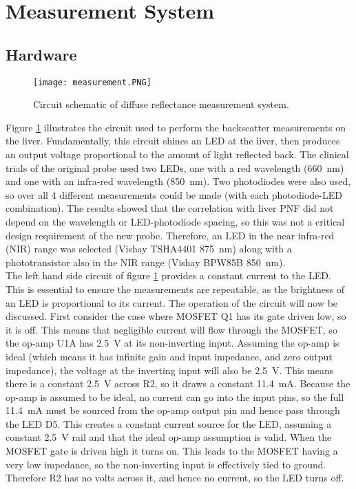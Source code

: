 \section{Measurement System}
\subsection{Hardware}

\begin{figure}[htbp]
	\centering
	\texttt{[image: measurement.PNG]}
	\caption{Circuit schematic of diffuse reflectance measurement system.}
	\label{fig: measurement schematic}
\end{figure}

Figure \ref{fig: measurement schematic} illustrates the circuit used to perform the backscatter measurements on the liver. Fundamentally, this circuit shines an LED at the liver, then produces an output voltage proportional to the amount of light reflected back. The clinical trials of the original probe \cite{Robertson} used two LEDs, one with a red wavelength (\SI{660}{\nano\metre}) and one with an infra-red wavelength (\SI{850}{\nano\metre}). Two photodiodes were also used, so over all 4 different measurements could be made (with each photodiode-LED combination). The results showed that the correlation with liver PNF did not depend on the wavelength or LED-photodiode spacing, so this was not a critical design requirement of the new probe. Therefore, an LED in the near infra-red (NIR) range was selected (Vishay TSHA4401 \cite{tsha4401} \SI{875}{\nano\metre}) along with a phototransistor also in the NIR range (Vishay BPW85B \cite{bpw85b} \SI{850}{\nano\metre}).\\

The left hand side circuit of figure \ref{fig: measurement schematic} provides a constant current to the LED. This is essential to ensure the measurements are repeatable, as the brightness of an LED is proportional to its current. The operation of the circuit will now be discussed. First consider the case where MOSFET Q1 has its gate driven low, so it is off. This means that negligible current will flow through the MOSFET, so the op-amp U1A has \SI{2.5}{\volt} at its non-inverting input. Assuming the op-amp is ideal (which means it has infinite gain and input impedance, and zero output impedance), the voltage at the inverting input will also be \SI{2.5}{\volt}. This means there is a constant \SI{2.5}{\volt} across R2, so it draws a constant \SI{11.4}{\milli\ampere}. Because the op-amp is assumed to be ideal, no current can go into the input pins, so the full \SI{11.4}{\milli\ampere} must be sourced from the op-amp output pin and hence pass through the LED D5. This creates a constant current source for the LED, assuming a constant \SI{2.5}{\volt} rail and that the ideal op-amp assumption is valid. When the MOSFET gate is driven high it turns on. This leads to the MOSFET having a very low impedance, so the non-inverting input is effectively tied to ground. Therefore R2 has no volts across it, and hence no current, so the LED turns off.\\

